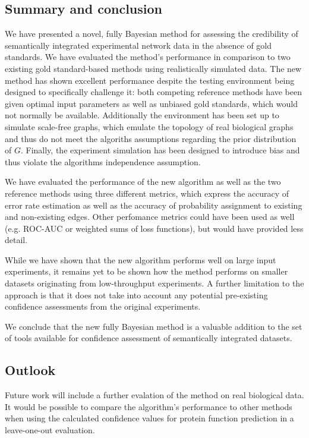 \documentclass{bioinfo}
\begin{document}
\subsection{Summary and conclusion}

We have presented a novel, fully Bayesian method for assessing the credibility of semantically integrated experimental network data in the absence of gold standards. We have evaluated the method's performance in comparison to two existing gold standard-based methods using realistically simulated data. The new method has shown excellent performance despite the testing environment being designed to specifically challenge it: both competing reference methods have been given optimal input parameters as well as unbiased gold standards, which would not normally be available. Additionally the environment has been set up to simulate scale-free graphs, which emulate the topology of real biological graphs and thus do not meet the algoriths assumptions regarding the prior distribution of $G$. Finally, the experiment simulation has been designed to introduce bias and thus violate the algorithms independence assumption.

We have evaluated the performance of the new algorithm as well as the two reference methods using three different metrics, which express the accuracy of error rate estimation as well as the accuracy of probability assignment to existing and non-existing edges. Other perfomance metrics could have been used as well (e.g. ROC-AUC or weighted sums of loss functions), but would have provided less detail.

While we have shown that the new algorithm performs well on large input experiments, it remains yet to be shown how the method performs on smaller datasets originating from low-throughput experiments. A further limitation to the approach is that it does not take into account any potential pre-existing confidence assessments from the original experiments.

We conclude that the new fully Bayesian method is a valuable addition to the set of tools available for confidence assessment of semantically integrated datasets.

\subsection{Outlook}

Future work will include a further evalation of the method on real biological data. It would be possible to compare the algorithm's performance to other methods when using the calculated confidence values for protein function prediction in a leave-one-out evaluation.
\end{document}
